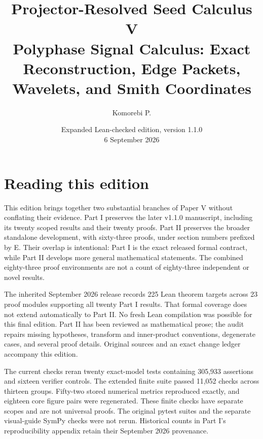 \documentclass[11pt,a4paper]{article}
\title{\textbf{Projector-Resolved Seed Calculus V}\\[0.45em]
\large Polyphase Signal Calculus: Exact Reconstruction, Edge Packets, Wavelets, and Smith Coordinates}
\author{Komorebi P.}
\date{Expanded Lean-checked edition, version 1.1.0\\\small 6 September 2026}
\theoremstyle{definition}
\theoremstyle{remark}
\begin{document}
\KomorebiCover
{}


\section*{Reading this edition}
This edition brings together two substantial branches of Paper V without conflating their evidence. Part I preserves the later v1.1.0 manuscript, including its twenty scoped results and their twenty proofs. Part II preserves the broader standalone development, with sixty-three proofs, under section numbers prefixed by E. Their overlap is intentional: Part I is the exact released formal contract, while Part II develops more general mathematical statements. The combined eighty-three proof environments are not a count of eighty-three independent or novel results.

The inherited September 2026 release records 225 Lean theorem targets across 23 proof modules supporting all twenty Part I results. That formal coverage does not extend automatically to Part II. No fresh Lean compilation was possible for this final edition. Part II has been reviewed as mathematical prose; the audit repairs missing hypotheses, transform and inner-product conventions, degenerate cases, and several proof details. Original sources and an exact change ledger accompany this edition.

The current checks reran twenty exact-model tests containing 305,933 assertions and sixteen verifier controls. The extended finite suite passed 11,052 checks across thirteen groups. Fifty-two stored numerical metrics reproduced exactly, and eighteen core figure pairs were regenerated. These finite checks have separate scopes and are not universal proofs. The original pytest suites and the separate visual-guide SymPy checks were not rerun. Historical counts in Part I's reproducibility appendix retain their September 2026 provenance.
\end{document}
